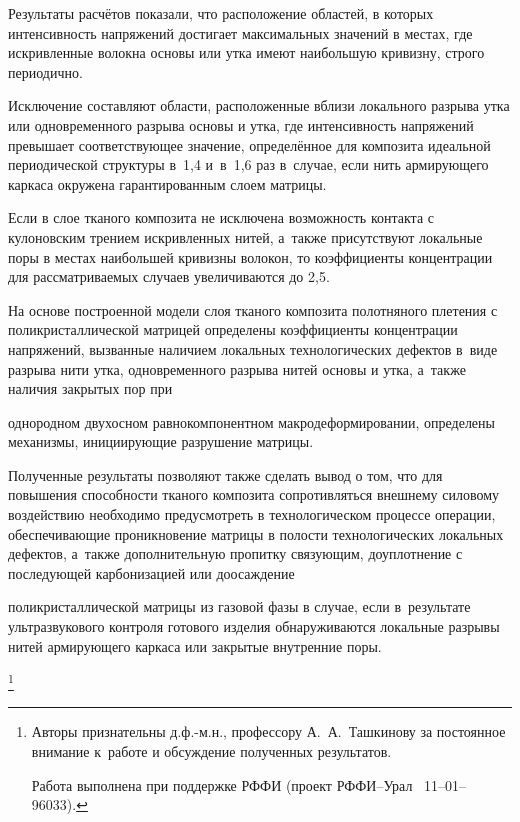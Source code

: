 
Результаты расчётов показали, что расположение областей, в которых интенсивность напряжений достигает максимальных значений в местах, где искривленные волокна основы или утка имеют наибольшую кривизну, строго периодично.

Исключение составляют области, расположенные вблизи локального разрыва утка или одновременного разрыва основы и утка, где интенсивность напряжений превышает соответствующее значение, определённое для композита идеальной периодической структуры в~1,4 и~в~1,6 раз в~случае, если нить армирующего каркаса окружена гарантированным слоем матрицы. %

Если в слое тканого композита не исключена возможность контакта с кулоновским трением искривленных нитей, а~также присутствуют локальные поры в местах наибольшей кривизны волокон, то коэффициенты концентрации для рассматриваемых случаев увеличиваются до 2,5.



\smallskip




На основе построенной модели слоя тканого композита полотняного плетения с поликристаллической матрицей определены коэффициенты концентрации напряжений, вызванные наличием локальных технологических дефектов в~виде разрыва нити утка, одновременного разрыва нитей основы и утка, а~также наличия закрытых пор при

однородном двухосном равнокомпонентном макродеформировании, определены механизмы, инициирующие разрушение матрицы.



Полученные результаты позволяют также сделать вывод о том, что для повышения способности тканого композита сопротивляться внешнему силовому воздействию необходимо предусмотреть в технологическом процессе операции, обеспечивающие проникновение матрицы в полости технологических локальных дефектов, а~также дополнительную пропитку связующим, доуплотнение с последующей карбонизацией или доосаждение

поликристаллической матрицы из газовой фазы в случае, если в~результате ультразвукового контроля готового изделия обнаруживаются локальные разрывы нитей армирующего каркаса или закрытые внутренние поры.



\thanks{ \noindent Авторы признательны д.ф.-м.н., профессору А.~А.~Ташкинову за постоянное внимание к~работе и обсуждение полученных результатов.



\noindent 

Работа выполнена при поддержке РФФИ (проект РФФИ--Урал \No~11--01--96033).

}



